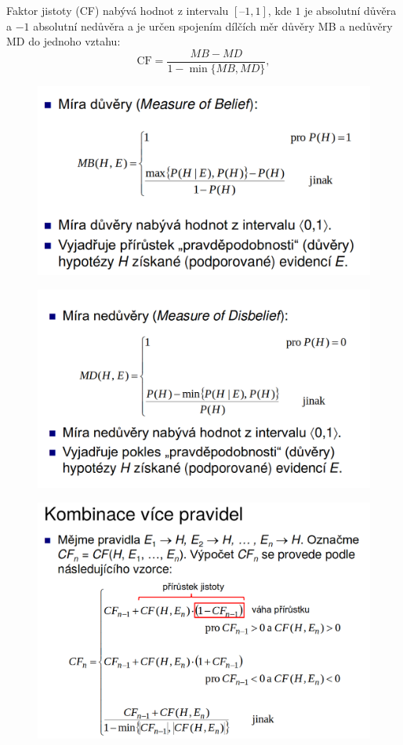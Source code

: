 \documentclass[12pt]{article}
\begin{document}
Faktor jistoty (CF) nabývá hodnot z intervalu $[–1,1]$, kde $1$ je absolutní důvěra a $-1$ absolutní nedůvěra a je určen spojením dílčích měr důvěry MB a nedůvěry MD do jednoho vztahu:
\begin{equation}
\text{CF}=\frac{MB-MD}{1-\min{\{MB, MD\}}},
\end{equation}
\begin{figure}[h!]
\includegraphics[scale=0.3]{duvera}
\end{figure}
\begin{figure}[h!]
\includegraphics[scale=0.3]{neduvera}
\end{figure}
\begin{figure}[h!]
\includegraphics[scale=0.3]{kombinace}
\end{figure}
\end{document}

